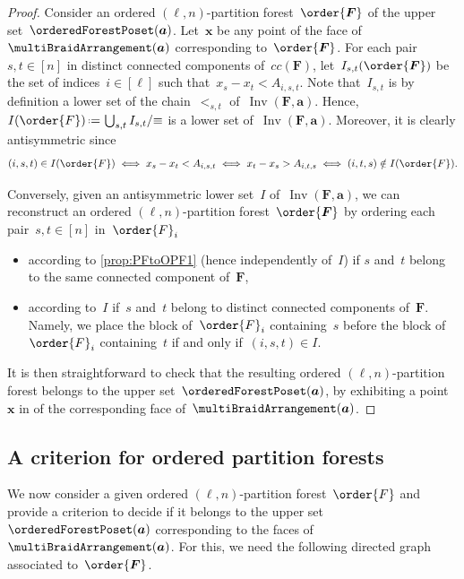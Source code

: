 \documentclass{amsart}
\theoremstyle{definition}
\renewcommand{\b}[1]{{\boldsymbol{#1}}} %
\newcommand{\eqdef}{\mbox{\,\raisebox{0.2ex}{\scriptsize\ensuremath{\mathrm:}}\ensuremath{=}\,}} %
\DeclareMathOperator{\Inv}{Inv} %
\renewcommand{\b}[1]{\boldsymbol{#1}} %
\begin{document}
\begin{proof}
Consider an ordered $(\ell,n)$-partition forest~$\order{\b{F}}$ of the upper set~$\orderedForestPoset(\b{a})$.
Let~$\b{x}$ be any point of the face of~$\multiBraidArrangement(\b{a})$ corresponding to~$\order{\b{F}}$.
For each pair~$s,t \in [n]$ in distinct connected components of~$cc(\b{F})$, let~$I_{s,t}(\order{\b{F}})$ be the set of indices~$i \in [\ell]$ such that~$x_s - x_t < A_{i,s,t}$.
Note that~$I_{s,t}$ is by definition a lower set of the chain~$<_{s,t}$ of~$\Inv(\b{F}, \b{a})$.
Hence, $I(\order{F}) \eqdef \bigcup_{s,t} I_{s,t} / {\equiv}$ is a lower set of~$\Inv(\b{F}, \b{a})$.
Moreover, it is clearly antisymmetric since
\[
(i,s,t) \in I(\order{F}) \iff x_s - x_t < A_{i,s,t} \iff x_t - x_s > A_{i,t,s} \iff (i,t,s) \notin I(\order{F}).
\]

Conversely, given an antisymmetric lower set~$I$ of~$\Inv(\b{F}, \b{a})$, we can reconstruct an ordered $(\ell,n)$-partition forest~$\order{\b{F}}$ by ordering each pair~$s,t \in [n]$ in~$\order{F}_i$ 
\begin{itemize}
\item according to \cref{prop:PFtoOPF1} (hence independently of~$I$) if $s$ and~$t$ belong to the same connected component of~$\b{F}$,
\item according to~$I$ if~$s$ and~$t$ belong to distinct connected components of~$\b{F}$. Namely, we place the block of~$\order{F}_i$ containing~$s$ before the block of~$\order{F}_i$ containing~$t$ if and only if~$(i,s,t) \in I$.
\end{itemize}
It is then straightforward to check that the resulting ordered $(\ell,n)$-partition forest belongs to the upper set~$\orderedForestPoset(\b{a})$, by exhibiting a point~$\b{x}$ in of the corresponding face of~$\multiBraidArrangement(\b{a})$.
\end{proof}


\subsection{A criterion for ordered partition forests}
\label{subsec:criterionOPF}

We now consider a given ordered $(\ell,n)$-partition forest~$\order{F}$ and provide a criterion to decide if it belongs to the upper set~$\orderedForestPoset(\b{a})$ corresponding to the faces of~$\multiBraidArrangement(\b{a})$.
For this, we need the following directed graph associated to~$\order{\b{F}}$.
\end{document}
